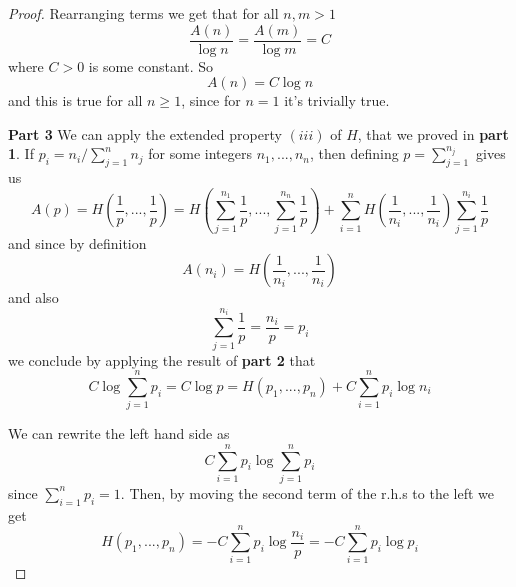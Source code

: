 \documentclass[12pt]{article}
\begin{document}
\begin{proof}
Rearranging terms we get that for all $n, m > 1$
\begin{equation}
    \frac{A(n)}{\log n} = \frac{A(m)}{\log m} = C 
\end{equation}
where $C > 0$ is some constant. So 
\begin{equation}
    A(n) = C \log n 
\end{equation}
and this is true for all $n \geq 1$, since for $n = 1$ it's trivially  true.

\noindent \textbf{Part 3}
We can apply the extended property $(iii)$ of $H$, that we proved in \textbf{part 1}. If $p_i = n_i / \sum_{j=1}^{n}{n_j}$ for some integers $n_1, ..., n_n$, then defining $p = \sum_{j=1}^{n_j}$ gives us 
\begin{equation}
    A(p) = H\left(\frac{1}{p}, ..., \frac{1}{p}\right) = H\left(\sum_{j=1}^{n_1}{\frac{1}{p}}, ..., \sum_{j=1}^{n_n}{\frac{1}{p}}\right) + \sum_{i=1}^{n}{H\left(\frac{1}{n_i}, ..., \frac{1}{n_i}\right)\sum_{j=1}^{n_i}{\frac{1}{p}}}
\end{equation}
and since by definition 
\begin{equation}
    A(n_i) = H\left(\frac{1}{n_i}, ..., \frac{1}{n_i}\right)
\end{equation}
and also 
\begin{equation}
    \sum_{j=1}^{n_i}{\frac{1}{p}} = \frac{n_i}{p} = p_i 
\end{equation}
we conclude by applying the result of \textbf{part 2} that 
\begin{equation}
    C \log \sum_{j=1}^{n}{p_i} = C \log p = H(p_1, ..., p_n) + C\sum_{i=1}^{n}{p_i \log n_i  }
\end{equation}

We can rewrite the left hand side as 
\begin{equation}
    C \sum_{i=1}^{n}{p_i \log \sum_{j=1}^{n}{p_i}}
\end{equation}
since $\sum_{i=1}^{n}{p_i} = 1$. Then, by moving the second term of the r.h.s to the left we get 
\begin{equation}\label{eq:3}
    H(p_1, ..., p_n) = -C \sum_{i=1}^{n}{p_i \log \frac{n_i}{p}} = -C\sum_{i=1}^{n}{p_i \log p_i}
\end{equation}


\end{proof}
\end{document}
